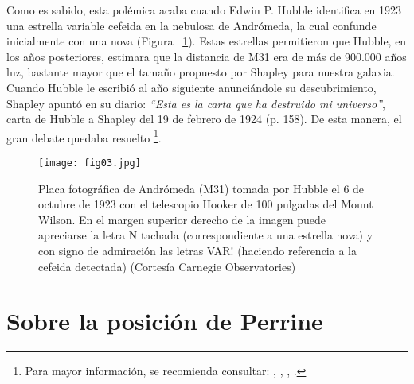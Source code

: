 \documentclass[baaa]{baaa}
\begin{document}
Como es sabido, esta polémica acaba cuando Edwin P. Hubble identifica en 1923 una estrella variable cefeida en la nebulosa de Andrómeda, la cual confunde inicialmente con una nova (Figura ~\ref{Figura3}). Estas estrellas permitieron que Hubble, en los años posteriores, estimara que la distancia de M31 era de más de 900.000 años luz, bastante mayor que el tamaño propuesto por Shapley para nuestra galaxia. Cuando Hubble le escribió al año siguiente anunciándole su descubrimiento, Shapley apuntó en su diario: \textit{“Esta es la carta que ha destruido mi universo”}, carta de Hubble a Shapley del 19 de febrero de 1924 \citep{Smith1993} (p. 158). De esta manera, el gran debate quedaba resuelto \footnote{Para mayor información, se recomienda consultar: \citep{1960S&T....19..398S}, \citep{1970ASPL...10..313H}, \citep{1976JHA.....7..169H}, \citep{1995PASP..107.1133T}.}.

\begin{figure}[!t]
\centering
\texttt{[image: fig03.jpg]}
\caption{Placa fotográfica de Andrómeda (M31) tomada por Hubble el 6 de octubre de 1923 con el telescopio Hooker de 100 pulgadas del Mount Wilson. En el margen superior derecho de la imagen puede apreciarse la letra N tachada (correspondiente a una estrella nova) y con signo de admiración las letras VAR! (haciendo referencia a la cefeida detectada) (Cortesía Carnegie Observatories)}
\label{Figura3}
\end{figure}

\section{Sobre la posición de Perrine}
\end{document}
